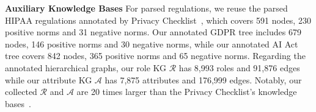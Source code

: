 \noindent\textbf{Auxiliary Knowledge Bases}
For parsed regulations, we reuse the parsed HIPAA regulations annotated by Privacy Checklist~\cite{li-2024-privacychecklist}, which covers 591 nodes, 230 positive norms and 31 negative norms.
Our annotated GDPR tree includes 679 nodes, 146 positive norms and 30 negative norms, while our annotated AI Act tree covers 842 nodes, 365 positive norms and 65 negative norms.
Regarding the annotated hierarchical graphs, 
our role KG $\mathcal{R}$ has 8,993 roles and 91,876 edges
while our attribute KG $\mathcal{A}$ has 7,875  attributes and 176,999 edges.
Notably, our collected $\mathcal{R}$ and $\mathcal{A}$ are 20 times larger than the Privacy Checklist's knowledge bases~\cite{li-2024-privacychecklist}.



